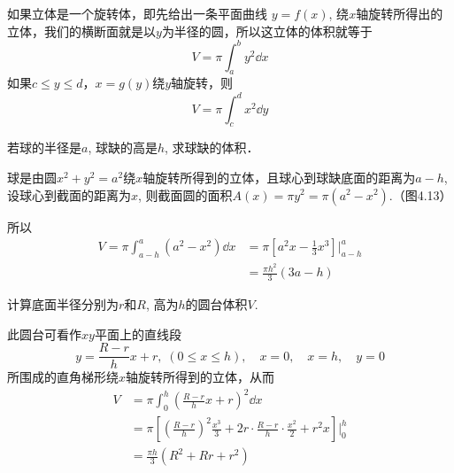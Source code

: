 如果立体是一个旋转体，即先给出一条平面曲线
$y=f(x)$, 绕$x$轴旋转所得出的立体，我们的横断面就是以$y$为半径的圆，所以这立体的体积就等于
\[V=\pi \int^b_a y^2\dd x\]
如果$c\le y\le d$，$x=g(y)$绕$y$轴旋转，则
\[V=\pi \int^d_c x^2\dd y\]


\begin{example}
若球的半径是$a$, 球缺的高是$h$, 求球缺的体积．
\end{example}

\begin{figure}[htp]
    \centering
{}
    \caption{}
\end{figure}


\begin{solution}
球是由圆$x^2+y^2=a^2$绕$x$轴旋转所得到的立体，且球心到球缺底面的距离为$a-h$, 设球心到截面的距离为$x$, 则截面圆的面积$A (x) =\pi y^2=\pi  (a^2-x^2)$.（图4.13）

所以
\[\begin{split}
    V=\pi\int^a_{a-h}(a^2-x^2)\dd x&=\pi\left[a^2 x-\frac{1}{3}x^3\right]\Bigg|^a_{a-h}\\
    &=\frac{\pi h^2}{3}(3a-h)
\end{split} \]
\end{solution}

\begin{example}
    计算底面半径分别为$r$和$R$, 高为$h$的圆台体积$V$.
\end{example}

\begin{solution}
此圆台可看作$xy$平面上的直线段
\[y=\frac{R-r}{h}x+r,\; (0\le x\le h),\quad x=0,\quad x=h,\quad y=0\]
所围成的直角梯形绕$x$轴旋转所得到的立体，从而
\[\begin{split}
    V&=\pi\int^h_0 \left(\frac{R-r}{h}x+r\right)^2 \dd x\\
    &=\pi\left[\left(\frac{R-r}{h}\right)^2\frac{x^3}{3}+2r\cdot \frac{R-r}{h}\cdot \frac{x^2}{2}+r^2 x\right]\Bigg|^h_0\\
    &=\frac{\pi h}{3}(R^2+Rr+r^2)
\end{split}\]
\end{solution}

